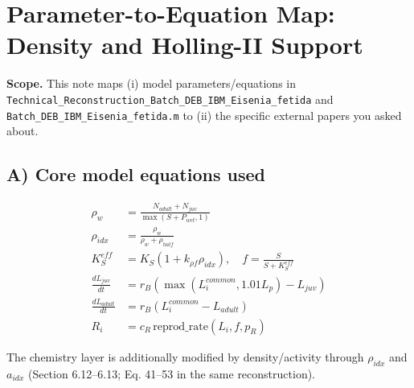 \documentclass[11pt]{article}
\begin{document}
\section*{Parameter-to-Equation Map: Density and Holling-II Support}
\textbf{Scope.} This note maps (i) model parameters/equations in
\texttt{Technical\_Reconstruction\_Batch\_DEB\_IBM\_Eisenia\_fetida} and
\texttt{Batch\_DEB\_IBM\_Eisenia\_fetida.m} to (ii) the specific external
papers you asked about.

\subsection*{A) Core model equations used}
\begin{align}
\rho_w &= \frac{N_{adult}+N_{juv}}{\max(S+P_{wet},1)} \tag{60}\\
\rho_{idx} &= \frac{\rho_w}{\rho_w+\rho_{half}} \tag{60}\\
K_S^{eff} &= K_S\left(1+k_{\rho f}\rho_{idx}\right), \quad
f=\frac{S}{S+K_S^{eff}} \tag{61}\\
\frac{dL_{juv}}{dt} &= r_B\!\left(\max(L_i^{common},1.01L_p)-L_{juv}\right) \tag{63}\\
\frac{dL_{adult}}{dt} &= r_B\!\left(L_i^{common}-L_{adult}\right) \tag{64}\\
R_i &= c_R\,\mathrm{reprod\_rate}(L_i,f,p_R) \tag{69}
\end{align}

The chemistry layer is additionally modified by density/activity through
\(\rho_{idx}\) and \(a_{idx}\) (Section 6.12--6.13; Eq. 41--53 in the same reconstruction).
\end{document}
